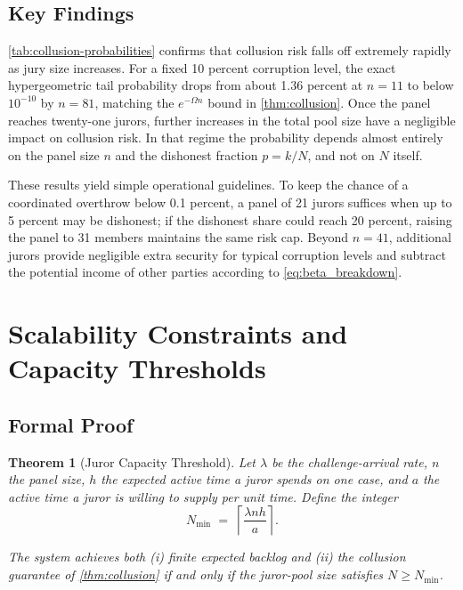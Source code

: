\documentclass{article}
\newtheorem{theorem}{Theorem}[section]
\begin{document}
\subsection{Key Findings}

\autoref{tab:collusion-probabilities} confirms that collusion risk falls off extremely rapidly as jury size increases. For a fixed 10 percent corruption level, the exact hypergeometric tail probability drops from about 1.36 percent at $n=11$ to below $10^{-10}$ by $n=81$, matching the $e^{-\Omega n}$ bound in \autoref{thm:collusion}. Once the panel reaches twenty-one jurors, further increases in the total pool size have a negligible impact on collusion risk. In that regime the probability depends almost entirely on the panel size \(n\) and the dishonest fraction \(p=k/N\), and not on \(N\) itself.

These results yield simple operational guidelines. To keep the chance of a coordinated overthrow below 0.1 percent, a panel of 21 jurors suffices when up to 5 percent may be dishonest; if the dishonest share could reach 20 percent, raising the panel to 31 members maintains the same risk cap. Beyond $n=41$, additional jurors provide negligible extra security for typical corruption levels and subtract the potential income of other parties according to \cref{eq:beta_breakdown}.

\section{Scalability Constraints and Capacity Thresholds}

\subsection{Formal Proof}
\label{app:capacity}

\begin{theorem}[Juror Capacity Threshold]\label{thm:capacity}
Let $\lambda$ be the challenge-arrival rate, $n$ the panel size, $h$ the expected active time a juror spends on one case, and $a$ the active time a juror is willing to supply per unit time.
Define the integer
\begin{equation}
N_{\min}\;=\;\left\lceil \dfrac{\lambda n h}{a} \right\rceil.
\label{eq:min_jurors}
\end{equation}

The system achieves both (i) finite expected backlog and (ii) the collusion guarantee of \autoref{thm:collusion} \emph{if and only if} the juror-pool size satisfies $N \ge N_{\min}$.
\end{theorem}
\end{document}

